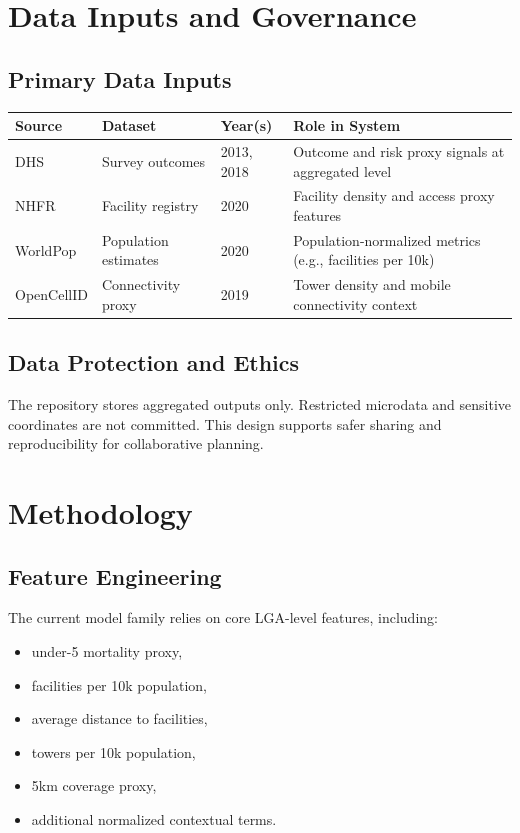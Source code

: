 \documentclass[11pt]{article}
\begin{document}
\section{Data Inputs and Governance}
\subsection{Primary Data Inputs}
\begin{longtable}{p{3.0cm}p{2.8cm}p{2.0cm}p{6.0cm}}
\toprule
\textbf{Source} & \textbf{Dataset} & \textbf{Year(s)} & \textbf{Role in System} \\
\midrule
DHS & Survey outcomes & 2013, 2018 & Outcome and risk proxy signals at aggregated level \\
NHFR & Facility registry & 2020 & Facility density and access proxy features \\
WorldPop & Population estimates & 2020 & Population-normalized metrics (e.g., facilities per 10k) \\
OpenCellID & Connectivity proxy & 2019 & Tower density and mobile connectivity context \\
\bottomrule
\end{longtable}

\subsection{Data Protection and Ethics}
The repository stores aggregated outputs only. Restricted microdata and sensitive coordinates are not committed. This design supports safer sharing and reproducibility for collaborative planning.

\section{Methodology}
\subsection{Feature Engineering}
The current model family relies on core LGA-level features, including:
\begin{itemize}[leftmargin=1.5em]
  \item under-5 mortality proxy,
  \item facilities per 10k population,
  \item average distance to facilities,
  \item towers per 10k population,
  \item 5km coverage proxy,
  \item additional normalized contextual terms.
\end{itemize}
\end{document}
